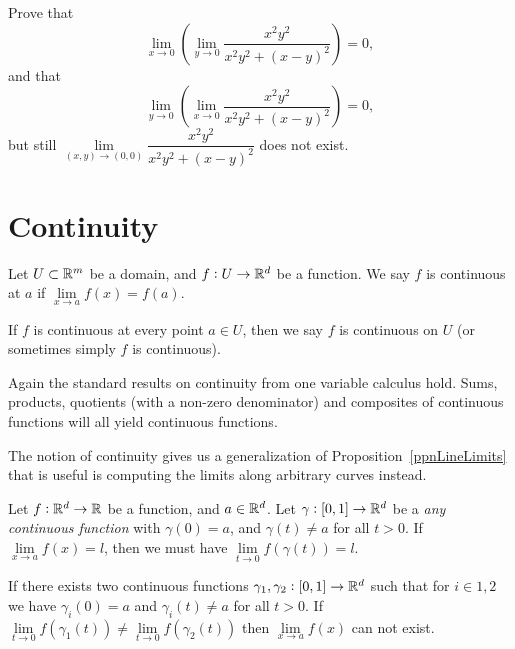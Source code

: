 \begin{multicols}{2}
\begin{problem}
Prove that $$\lim\limits _{x\to 0}\left(\lim\limits _{y\to 0}
\dfrac{x^2y^2}{x^2y^2+(x-y)^2}\right) = 0,$$ and that $$\lim\limits _{y\to
0}\left(\lim\limits _{x\to 0} \dfrac{x^2y^2}{x^2y^2+(x-y)^2}\right)=0,
$$but still  $\lim\limits _{(x,y)\to (0,0)} \dfrac{x^2y^2}{x^2y^2+(x-y)^2}$ does not exist.
\end{problem}

\end{multicols}

\section{Continuity}

\begin{df}
    Let $U \subset \mathbb{R}^m$ be a domain, and $f:U \to \mathbb{R}^d$ be a function.
    We say $f$ is continuous at $a$ if $\lim\limits_{x \to a} f(x) = f(a)$.
  \end{df}

  \begin{df}
    If $f$ is continuous at every point $a \in U$, then we say $f$ is continuous on $U$ (or sometimes simply $f$ is continuous).
  \end{df}

  Again the standard results on continuity from one variable calculus hold.
  Sums, products, quotients (with a non-zero denominator) and composites of continuous functions will all yield continuous functions.

  The notion of continuity gives us a generalization of Proposition~\ref{ppnLineLimits} that is useful is computing the limits along arbitrary curves instead.
  \begin{proposition}
    Let $f:\mathbb{R}^d \to \mathbb{R}$ be a function, and $a \in \mathbb{R}^d$.
    Let $\gamma:[0, 1] \to \mathbb{R}^d$ be a \emph{any continuous function} with $\gamma(0) = a$, and $\gamma( t ) \neq a$ for all $t > 0$.
    If $\lim\limits_{x \to a} f(x) = l$, then we must have $\lim\limits_{t \to 0} f( \gamma( t) ) = l$.
  \end{proposition}

  \begin{corollary}
    If there exists two continuous functions $\gamma_1, \gamma_2: [0, 1] \to \mathbb{R}^d$ such that for $i \in {1, 2}$ we have $\gamma_i(0) = a$ and $\gamma_i(t) \neq a$ for all $t > 0$.
    If $\lim\limits_{t \to 0} f(\gamma_1(t)) \neq \lim\limits_{t \to 0} f(\gamma_2(t))$ then $\lim\limits_{x \to a} f(x)$ can not exist.
  \end{corollary}





